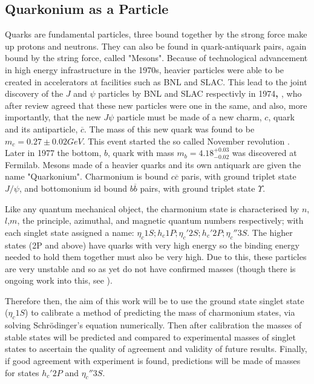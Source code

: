 \documentclass[10pt,twocolumn]{revtex4}    %
\begin{document}
\subsection{Quarkonium as a Particle}\label{ssec:CharmoinumParticl}
Quarks are fundamental particles, three bound together by the strong force make up protons and neutrons. They can also be found in quark-antiquark pairs, again bound by the string force, called "Mesons". 
Because of technological advancement in high energy infrastructure in the 1970s, heavier particles were able to be created in accelerators at facilities such as BNL and SLAC. This lead to the joint discovery of the $J$ and $\psi$ particles by BNL and SLAC respectivly in 1974\textbf{\cite{BNLPaper}, \cite{SLACPaper}}, who after review agreed that these new particles were one in the same, and also, more importantly, that the new $J\psi$ particle must be made of a new charm, $c$, quark and its antiparticle, $\overline{c}$. The mass of this new quark was found to be $m_c = 0.27\pm0.02GeV$. This event started the so called November revolution \textbf{\cite{DiscoveryQuarks}}.
Later in 1977 the bottom, $b$, quark with mass $m_b = 4.18^{+0.03}_{-0.02}$\textbf{\cite{pdg}} was discovered at Fermilab\textbf{\cite{BottomPaper}}.
Mesons made of a heavier quarks and its own antiquark are given the name "Quarkonium"\textbf{\cite{PotentialModels}}. Charmonium is bound $c\overline{c}$ paris, with ground triplet state $J/\psi$, and bottomonium id bound $b\overline{b}$ pairs, with ground triplet state $\Upsilon$.


Like any quantum mechanical object, the charmonium state is characterised by $n$,$l$,$m$, the principle, azimuthal, and magnetic quantum numbers respectively; with each singlet state assigned a name: $\eta_c{1S}; h_c{1P}; \eta_c'{2S}; h_c'{2P}; \eta_c''{3S}$. The higher states (2P and above) have quarks with very high energy so the binding energy needed to hold them together must also be very high. Due to this, these particles are very unstable and so as yet do not have confirmed masses (though there is ongoing work into this, see \textbf{\cite{Kher_2019}}).


Therefore then, the aim of this work will be to use the ground state singlet state ($\eta_c{1S}$) to calibrate a method of predicting the mass of charmonium states, via solving Schr\"odinger's equation numerically. Then after calibration the masses of stable states will be predicted and compared to experimental masses of singlet states to ascertain the quality of agreement and validity of future results. Finally, if good agreement with experiment is found, predictions will be made of masses for states $h_c'{2P}$ and $\eta_c''{3S}$. 
\end{document}
